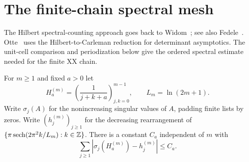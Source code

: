 \section{The finite-chain spectral mesh}\label{app:xx-mesh}
The Hilbert spectral-counting approach goes back to Widom~\cite{Widom66}; see also Fedele~\cite{Fedele20}. Otte~\cite[Sections~3--4]{Otte22} uses the Hilbert-to-Carleman reduction
for determinant asymptotics. The unit-cell comparison and periodization
below give the ordered spectral estimate needed for the finite XX chain.

\begin{lemma}
\label{lem:hilbert-mesh}
For $m\ge1$ and fixed $a>0$ let
\[
H_a^{(m)}=\left(\frac1{j+k+a}\right)_{j,k=0}^{m-1},
\qquad L_m=\ln(2m+1).
\]
Write $\sigma_j(A)$ for the nonincreasing singular values of $A$,
padding finite lists by zeros. Write $(h_j^{(m)})_{j\ge1}$ for the
decreasing rearrangement of
$\{\pi\operatorname{sech}(2\pi^2 k/L_m):k\in\mathbb Z\}$. There is a constant
$C_a$ independent of $m$ with
\[
\sum_{j\ge1}\left|\sigma_j(H_a^{(m)})-h_j^{(m)}\right|\le C_a.
\]
\end{lemma}

